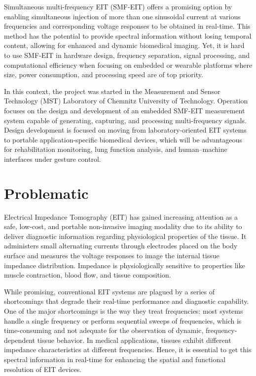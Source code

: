 Simultaneous multi-frequency EIT (SMF-EIT) offers a promising option by enabling simultaneous injection of more than one sinusoidal current at various frequencies and corresponding voltage responses to be obtained in real-time. This method has the potential to provide spectral information without losing temporal content, allowing for enhanced and dynamic biomedical imaging. Yet, it is hard to use SMF-EIT in hardware design, frequency separation, signal processing, and computational efficiency when focusing on embedded or wearable platforms where size, power consumption, and processing speed are of top priority.

In this context, the project was started in the Measurement and Sensor Technology (MST) Laboratory of Chemnitz University of Technology. Operation focuses on the design and development of an embedded SMF-EIT measurement system capable of generating, capturing, and processing multi-frequency signals. Design development is focused on moving from laboratory-oriented EIT systems to portable application-specific biomedical devices, which will be advantageous for rehabilitation monitoring, lung function analysis, and human–machine interfaces under gesture control.
\section{Problematic}
Electrical Impedance Tomography (EIT) has gained increasing attention as a safe, low-cost, and portable non-invasive imaging modality due to its ability to deliver diagnostic information regarding physiological properties of the tissue. It administers small alternating currents through electrodes placed on the body surface and measures the voltage responses to image the internal tissue impedance distribution. Impedance is physiologically sensitive to properties like muscle contraction, blood flow, and tissue composition.

While promising, conventional EIT systems are plagued by a series of shortcomings that degrade their real-time performance and diagnostic capability. One of the major shortcomings is the way they treat frequencies: most systems handle a single frequency or perform sequential sweeps of frequencies, which is time-consuming and not adequate for the observation of dynamic, frequency-dependent tissue behavior. In medical applications, tissues exhibit different impedance characteristics at different frequencies. Hence, it is essential to get this spectral information in real-time for enhancing the spatial and functional resolution of EIT devices.


